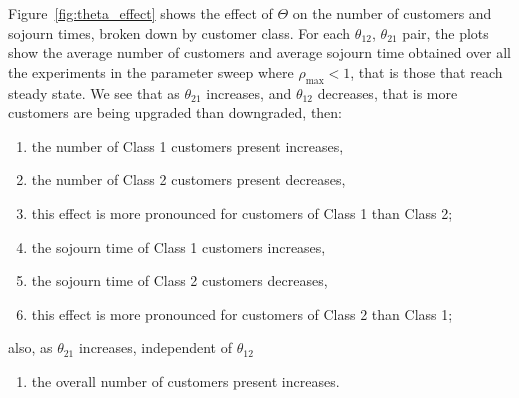 \documentclass{article}
\begin{document}
Figure~\ref{fig:theta_effect} shows the effect of $\Theta$ on the number of
customers and sojourn times, broken down by customer class. For each
$\theta_{12}$, $\theta_{21}$ pair, the plots show the average number of
customers and average sojourn time obtained over all the experiments in the
parameter sweep where $\rho_{\max} < 1$, that is those that reach steady state.
We see that as $\theta_{21}$ increases, and $\theta_{12}$ decreases, that is
more customers are being upgraded than downgraded, then:

{
\renewcommand{\theenumi}{E\arabic{enumi}}
\begin{enumerate}
  \item \label{enm:custs_1over2} the number of Class 1 customers present increases,
  \item \label{enm:custs_2over1} the number of Class 2 customers present decreases,
  \item \label{enm:custs_pronounced} this effect is more pronounced for customers of Class 1 than Class 2;
  \item \label{enm:sojourn_1over2} the sojourn time of Class 1 customers increases,
  \item \label{enm:sojourn_2over1} the sojourn time of Class 2 customers decreases,
  \item \label{enm:sojourn_pronounced} this effect is more pronounced for customers of Class 2 than Class 1;
\end{enumerate}

also, as $\theta_{21}$ increases, independent of $\theta_{12}$

\begin{enumerate}[resume]
  \item \label{enm:custs} the overall number of customers present increases.
\end{enumerate}
}
\end{document}
